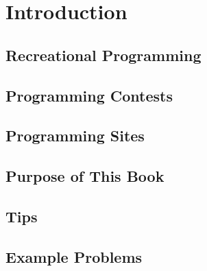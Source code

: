 \section{Introduction}
\subsection{Recreational Programming}
\subsection{Programming Contests}
\subsection{Programming Sites}
\subsection{Purpose of This Book}
\subsection{Tips}
\subsection{Example Problems}
